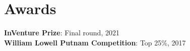 \documentclass[letterpaper,11pt]{article}
\begin{document}
\section{Awards}
\begin{itemize}[leftmargin=0.15in, rightmargin=\leftmargin, label={}]
   \small{\item{
     {\color{accent}\textbf{InVenture Prize}}{: Final round, 2021} \\
    {\color{accent}\textbf{William Lowell Putnam Competition}}{: Top 25\%, 2017}
   }}
\end{itemize}


\end{document}

